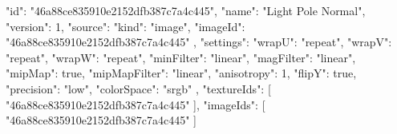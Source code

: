 {
  "id": "46a88ce835910e2152dfb387c7a4c445",
  "name": "Light Pole Normal",
  "version": 1,
  "source": {
    "kind": "image",
    "imageId": "46a88ce835910e2152dfb387c7a4c445"
  },
  "settings": {
    "wrapU": "repeat",
    "wrapV": "repeat",
    "wrapW": "repeat",
    "minFilter": "linear",
    "magFilter": "linear",
    "mipMap": true,
    "mipMapFilter": "linear",
    "anisotropy": 1,
    "flipY": true,
    "precision": "low",
    "colorSpace": "srgb"
  },
  "textureIds": [
    "46a88ce835910e2152dfb387c7a4c445"
  ],
  "imageIds": [
    "46a88ce835910e2152dfb387c7a4c445"
  ]
}
